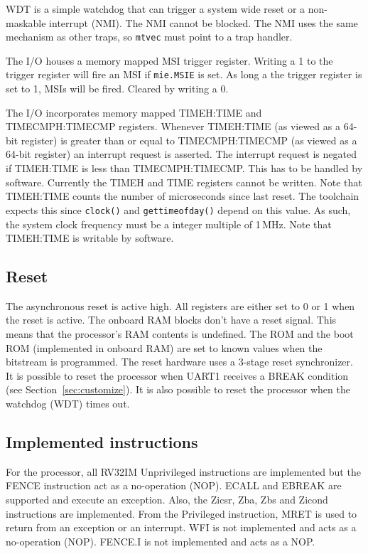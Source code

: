 \documentclass[12pt]{article}
\begin{document}
WDT is a simple watchdog that can trigger a system wide reset or a non-maskable interrupt (NMI). The NMI cannot be blocked. The NMI uses the same mechanism as other traps, so \lstinline|mtvec| must point to a trap handler.

The I/O houses a memory mapped MSI trigger register. Writing a 1 to the trigger register will fire an MSI if \lstinline[breaklines=false]|mie.MSIE| is set. As long a the trigger register is set to 1, MSIs will be fired. Cleared by writing a 0.

The I/O incorporates memory mapped TIMEH:TIME and TIMECMPH:TIMECMP registers. Whenever TIMEH:TIME (as viewed as a 64-bit register) is greater than or equal to TIMECMPH:TIMECMP (as viewed as a 64-bit register) an interrupt request is asserted. The interrupt request is negated if TIMEH:TIME is less than TIMECMPH:TIMECMP. This has to be handled by software. Currently the TIMEH and TIME registers cannot be written. Note that TIMEH:TIME counts the number of microseconds since last reset. The toolchain expects this since \lstinline|clock()| and \lstinline|gettimeofday()| depend on this value. As such, the system clock frequency must be a integer multiple of 1\,MHz. Note that TIMEH:TIME is writable by software.

\subsection{Reset}
The asynchronous reset is active high. All registers are either set to 0 or 1 when the reset is active. The onboard RAM blocks don't have a reset signal. This means that the processor's RAM contents is undefined. The ROM and the boot ROM (implemented in onboard RAM) are set to known values when the bitstream is programmed. The reset hardware uses a 3-stage reset synchronizer. It is possible to reset the processor when UART1 receives a BREAK condition (see Section~\ref{sec:customize}). It is also possible to reset the processor when the watchdog (WDT) times out.

\subsection{Implemented instructions}
For the processor, all RV32IM Unprivileged instructions are implemented but the FENCE instruction act as a no-operation (NOP). ECALL and EBREAK are supported and execute an exception. Also, the Zicsr, Zba, Zbs and Zicond instructions are implemented. From the Privileged instruction, MRET is used to return from an exception or an interrupt. WFI is not implemented and acts as a no-operation (NOP). FENCE.I is not implemented and acts as a NOP.
\end{document}
